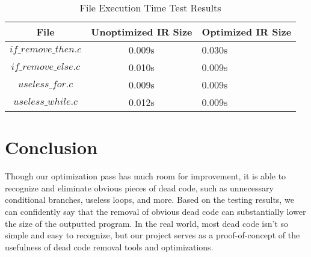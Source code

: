 \documentclass[sigconf]{acmart}
\begin{document}
\begin{table*}
  \caption{File Execution Time Test Results}
  \label{tab:commands}
  \begin{tabular}{ccl}
    \toprule
    File & Unoptimized IR Size & Optimized IR Size \\
    \midrule
    \texttt{$if\_remove\_then.c$}& 0.009s & 0.030s \\
    \texttt{$if\_remove\_else.c$}&  0.010s & 0.009s \\
    \texttt{$useless\_for.c$}& 0.009s & 0.009s  \\
    \texttt{$useless\_while.c$}& 0.012s &  0.009s \\
    \bottomrule
  \end{tabular}
\end{table*}

\section{Conclusion}
Though our optimization pass has much room for improvement, it is able to recognize 
and eliminate obvious pieces of dead code, such as unnecessary conditional branches, 
useless loops, and more. Based on the testing results, we can confidently say that the removal of obvious dead code 
can substantially lower the size of the outputted program. In the real world, most 
dead code isn't so simple and easy to recognize, but our project serves as a 
proof-of-concept of the usefulness of dead code removal tools and optimizations. 
\end{document}
